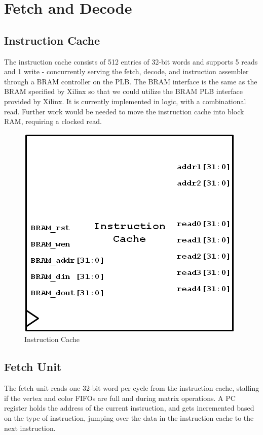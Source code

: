 \documentclass[letterpaper,10pt]{article}
\begin{document}
\section{Fetch and Decode}
\subsection{Instruction Cache}
The instruction cache consists of 512 entries of 32-bit words and supports 5 reads and 1 write - concurrently serving the fetch, decode, and instruction assembler through a BRAM controller on the PLB. The BRAM interface is the same as the BRAM specified by Xilinx so that we could utilize the BRAM PLB interface provided by Xilinx. It is currently implemented in logic, with a combinational read. Further work would be needed to move the instruction cache into block RAM, requiring a clocked read.

\begin{figure}[h!]
\begin{center}
\includegraphics[scale=.70]{instruction_cache.png}
\end{center}
\caption{Instruction Cache}
\label{fig:instruction_cache}
\end{figure}
\subsection{Fetch Unit}
The fetch unit reads one 32-bit word per cycle from the instruction cache, stalling if the vertex and color FIFOs are full and during matrix operations. A PC register holds the address of the current instruction, and gets incremented based on the type of instruction, jumping over the data in the instruction cache to the next instruction.
\end{document}
